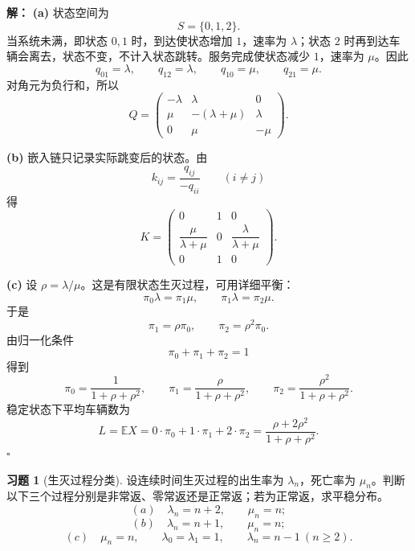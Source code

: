 \documentclass[12pt,a4paper,openany]{ctexrep}
\theoremstyle{definition}
\newtheorem{exercise}{习题}[section]
\newenvironment{solution}{\par\noindent\textbf{解：}}{\hfill$\square$\par}
\newcommand{\E}{\mathbb{E}}
\begin{document}
\begin{solution}
\textbf{(a)} 状态空间为
\[
S=\{0,1,2\}.
\]
当系统未满，即状态 $0,1$ 时，到达使状态增加 $1$，速率为 $\lambda$；状态 $2$ 时再到达车辆会离去，状态不变，不计入状态跳转。服务完成使状态减少 $1$，速率为 $\mu$。因此
\[
q_{01}=\lambda,\qquad q_{12}=\lambda,\qquad
q_{10}=\mu,\qquad q_{21}=\mu.
\]
对角元为负行和，所以
\[
Q=
\begin{pmatrix}
-\lambda&\lambda&0\\
\mu&-(\lambda+\mu)&\lambda\\
0&\mu&-\mu
\end{pmatrix}.
\]

\textbf{(b)} 嵌入链只记录实际跳变后的状态。由
\[
k_{ij}=\frac{q_{ij}}{-q_{ii}}\qquad(i\ne j)
\]
得
\[
K=
\begin{pmatrix}
0&1&0\\
\dfrac{\mu}{\lambda+\mu}&0&\dfrac{\lambda}{\lambda+\mu}\\
0&1&0
\end{pmatrix}.
\]

\textbf{(c)} 设 $\rho=\lambda/\mu$。这是有限状态生灭过程，可用详细平衡：
\[
\pi_0\lambda=\pi_1\mu,\qquad
\pi_1\lambda=\pi_2\mu.
\]
于是
\[
\pi_1=\rho\pi_0,\qquad
\pi_2=\rho^2\pi_0.
\]
由归一化条件
\[
\pi_0+\pi_1+\pi_2=1
\]
得到
\[
\pi_0=\frac1{1+\rho+\rho^2},\qquad
\pi_1=\frac{\rho}{1+\rho+\rho^2},\qquad
\pi_2=\frac{\rho^2}{1+\rho+\rho^2}.
\]
稳定状态下平均车辆数为
\[
L=\E X=0\cdot\pi_0+1\cdot\pi_1+2\cdot\pi_2
=\frac{\rho+2\rho^2}{1+\rho+\rho^2}.
\]
\end{solution}

\begin{exercise}[生灭过程分类]
设连续时间生灭过程的出生率为 $\lambda_n$，死亡率为 $\mu_n$。判断以下三个过程分别是非常返、零常返还是正常返；若为正常返，求平稳分布。
\[
(a)\quad \lambda_n=n+2,\qquad \mu_n=n;
\]
\[
(b)\quad \lambda_n=n+1,\qquad \mu_n=n;
\]
\[
(c)\quad \mu_n=n,\qquad \lambda_0=\lambda_1=1,\qquad \lambda_n=n-1\ (n\ge2).
\]
\end{exercise}
\end{document}
